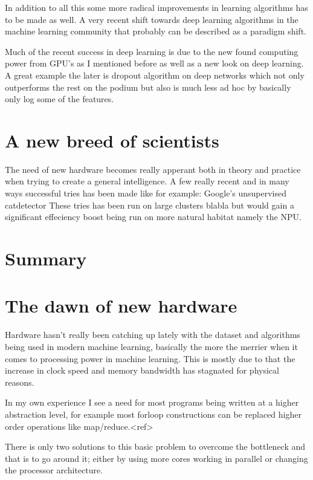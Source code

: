 \documentclass{article}
\begin{document}
    In addition to all this some more radical improvements in learning
    algorithms has to be made as well. A very recent shift towards deep
    learning algorithms in the machine learning community that probably can be
    described as a paradigm shift. 
   
    Much of the recent success in deep learning is due to the new found computing
    power from 
    GPU's as I mentioned before as well as a new look on deep learning. A great
    example the later is dropout algorithm on deep networks which not only
    outperforms the rest on the podium but also is much less ad hoc by
    basically only log some of the features.\cite{dropout}

\section{A new breed of scientists}
    The need of new hardware becomes really apperant both in
    theory and practice when trying to create a general intelligence.
    A few really recent and in many ways successful tries has been made
    like for example: Google's unsupervised catdetector %
    These tries has been run on large clusters blabla but would gain a
    significant effeciency boost being run on more natural habitat namely the
    NPU. 

\section{Summary} %

\section{The dawn of new hardware}

    Hardware hasn't really been catching up lately with the dataset and algorithms
    being used in modern machine learning, basically the more the merrier when it comes
    to processing power in machine learning. This is mostly due to that the
    increase in clock speed and memory bandwidth has stagnated for physical
    reasons.
    
    In my own experience I see a need for most programs being written at
    a higher abstraction level, for example most forloop constructions can be
    replaced higher order operations like map/reduce.<ref> 

    There is only two solutions to this basic problem to overcome the
    bottleneck and that is to go around it; either by using more cores working in
    parallel or changing the processor architecture.
\end{document}
